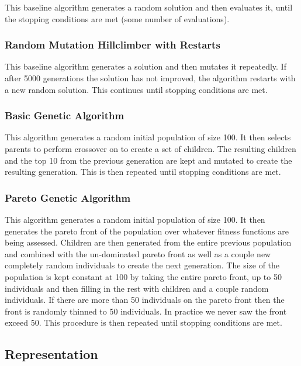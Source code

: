 \documentclass{acm_proc_article-sp}
\begin{document}
This baseline algorithm generates a random solution and then evaluates it, until the stopping conditions are met (some number of evaluations).

\subsubsection{Random Mutation Hillclimber with Restarts}

This baseline algorithm generates a solution and then mutates it repeatedly. If after 5000 generations the solution has not improved, the algorithm restarts with a new random solution. This continues until stopping conditions are met.

\subsubsection{Basic Genetic Algorithm}

This algorithm generates a random initial population of size 100. It then selects parents to perform crossover on to create a set of children. The resulting children and the top 10 from the previous generation are kept and mutated to create the resulting generation. This is then repeated until stopping conditions are met.

\subsubsection{Pareto Genetic Algorithm}

This algorithm generates a random initial population of size 100. It then generates the pareto front of the population over whatever fitness functions are being assessed. Children are then generated from the entire previous population and combined with the un-dominated pareto front as well as a couple new completely random individuals to create the next generation. The size of the population is kept constant at 100 by taking the entire pareto front, up to 50 individuals and then filling in the rest with children and a couple random individuals. If there are more than 50 individuals on the pareto front then the front is randomly thinned to 50 individuals. In practice we never saw the front exceed 50. This procedure is then repeated until stopping conditions are met.

\subsection{Representation}
\end{document}
